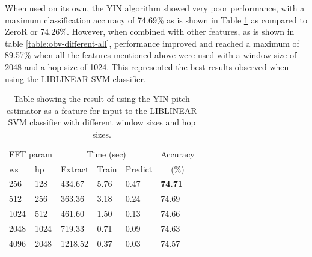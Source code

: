 \documentclass[12pt,oneside]{book}
\begin{document}
When used on its own, the YIN algorithm showed very poor performance,
with a maximum classification accuracy of 74.69\% as is shown in Table
\ref{table:obv-different-yin} as compared to ZeroR or 74.26\%.
However, when combined with other features, as is shown in table
\ref{table:obv-different-all}, performance improved and reached a
maximum of 89.57\% when all the features mentioned above were used
with a window size of 2048 and a hop size of 1024.  This represented
the best results observed when using the LIBLINEAR SVM classifier.

\begin{table}
\begin{tabular}{|l|l|l|l|l|l|}
\hline
\multicolumn{2}{|c|}{FFT param} & \multicolumn{3}{c|}{Time (sec)} & Accuracy \\
\hhline{|-|-|-|-|-|~|}
ws & hp & Extract & Train & Predict & \multicolumn{1}{c|}{(\%)} \\
\hhline{|=|=|=|=|=|=|}
256 & 128    &   434.67  &    5.76  &   0.47  &  \textbf{74.71}  \\
512 & 256    &   363.36  &    3.18  &   0.24  &  74.69  \\
1024 & 512   &   461.60  &    1.50  &   0.13  &  74.66  \\
2048 & 1024  &   719.33  &    0.71  &   0.09  &  74.63  \\
4096 & 2048  &  1218.52  &    0.37  &   0.03  &  74.57  \\
\hline
\end{tabular}
\caption{Table showing the result of using the YIN pitch estimator as
  a feature for input to the LIBLINEAR SVM classifier with different
  window sizes and hop sizes.}
\label{table:obv-different-yin}
\end{table}
\end{document}
